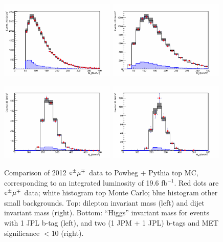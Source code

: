 \begin{figure}[!htb]
  \centerline{
    \includegraphics[width=0.49\textwidth]{plots/emu_zllm1_0}
    \includegraphics[width=0.49\textwidth]{plots/emu_zjjm2_0}
  }
  \centerline{
    \includegraphics[width=0.49\textwidth]{plots/emu_hm3_1}
    \includegraphics[width=0.49\textwidth]{plots/emu_hm3_3}
  }
  \caption{\label{figap:emudata1}Comparison of 2012 $\mathrm{e}^\pm\mu^\mp$ data to
    Powheg + Pythia top MC, corresponding to an integrated luminosity
    of 19.6 fb$^{-1}$. Red dots are $\mathrm{e}^\pm\mu^\mp$ data; white histogram top
    Monte Carlo; blue histogram other small backgrounds.  Top:
    dilepton invariant mass (left) and dijet invariant mass
    (right). Bottom: ``Higgs'' invariant mass for events with 1
    JPL b-tag (left), and two (1 JPM + 1 JPL) b-tags and MET
    significance $< 10$ (right).}
\end{figure}

